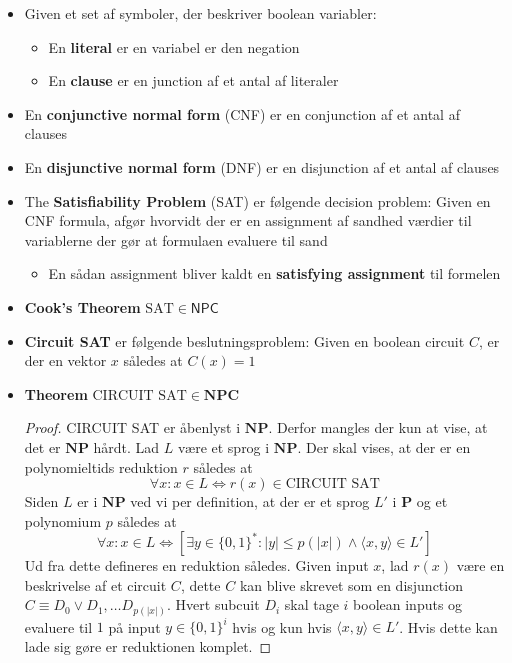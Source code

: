 \begin{itemize}
\begin{proof}
  \end{proof}
  \item Given et set af symboler, der beskriver boolean variabler:
  \begin{itemize}
  	\item En \textbf{literal} er en variabel er den negation
    \item En \textbf{clause} er en junction af et antal af literaler
  \end{itemize}
  \item En \textbf{conjunctive normal form} (CNF) er en conjunction af et antal af clauses 
  \item En \textbf{disjunctive normal form} (DNF) er en disjunction af et antal af clauses
  \item The \textbf{Satisfiability Problem} (SAT) er følgende decision problem: Given en CNF formula, afgør hvorvidt der er en assignment af sandhed værdier til variablerne der gør at formulaen evaluere til sand
  \begin{itemize}
  	\item En sådan assignment bliver kaldt en \textbf{satisfying assignment} til formelen
  \end{itemize}
  \item \textbf{Cook's Theorem} $\text{SAT} \in \mathsf{NPC}$
  \item \textbf{Circuit SAT} er følgende beslutningsproblem: Given en boolean circuit $C$, er der en vektor $x$ således at $C(x) = 1$
  \item \textbf{Theorem} $\text{CIRCUIT SAT} \in \mathbf{NPC}$
  \begin{proof} 
    CIRCUIT SAT er åbenlyst i $\mathbf{NP}$. Derfor mangles der kun at vise, at det er $\mathbf{NP}$ hårdt. Lad $L$ være et sprog i $\mathbf{NP}$. Der skal vises, at der er en polynomieltids reduktion $r$ således at
    \begin{equation*}
      \forall x : x \in L \Leftrightarrow r(x) \in \text{CIRCUIT SAT}
    \end{equation*}
    Siden $L$ er i $\mathbf{NP}$ ved vi per definition, at der er et sprog $L'$ i $\mathbf{P}$ og et polynomium $p$ således at
    \begin{equation*}
      \forall x: x \in L \Leftrightarrow [\exists y \in \{0,1\}^* : |y| \leq p(|x|) \land \langle x,y \rangle \in L']
    \end{equation*}
    Ud fra dette defineres en reduktion således. Given input $x$, lad $r(x)$ være en beskrivelse af et circuit $C$, dette $C$ kan blive skrevet som en disjunction $C \equiv D_0 \lor D_1, \dots D_{p(|x|)}$. Hvert subcuit $D_i$ skal tage $i$ boolean inputs og evaluere til $1$ på input $y \in \{0,1\}^i$ hvis og kun hvis $\langle x, y \rangle \in L'$. Hvis dette kan lade sig gøre er reduktionen komplet. \smallskip


\end{proof}
\end{itemize}
